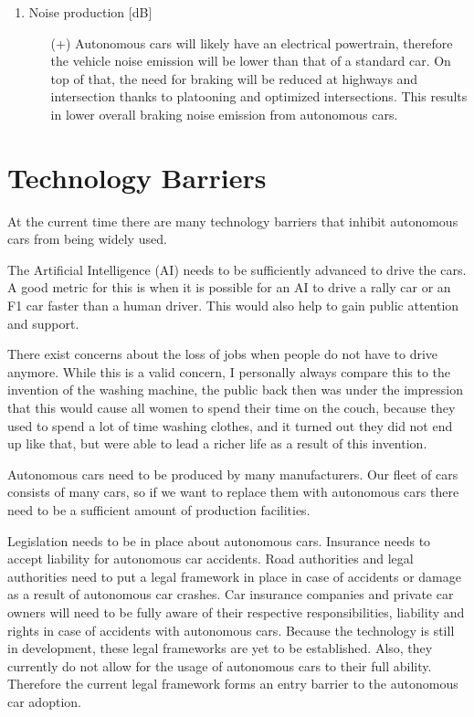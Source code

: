 \documentclass[a4paper]{article}
\begin{document}
\begin{enumerate}
\begin{enumerate}
    \end{enumerate}
\item Noise production [dB]
    \begin{enumerate}
    \item[($+$)] Autonomous cars will likely have an electrical powertrain, therefore the vehicle noise emission will be lower than that of a standard car. On top of that, the need for braking will be reduced at highways and intersection thanks to platooning and optimized intersections. This results in lower overall braking noise emission from autonomous cars.
    \end{enumerate}
\end{enumerate}

\section{Technology Barriers}
\label{sec:technology-barriers}

At the current time there are many technology barriers that inhibit autonomous cars from being widely used.

The Artificial Intelligence (AI) needs to be sufficiently advanced to drive the cars. A good metric for this is when it is possible for an AI to drive a rally car or an F1 car faster than a human driver. This would also help to gain public attention and support.

There exist concerns about the loss of jobs when people do not have to drive anymore. While this is a valid concern, I personally always compare this to the invention of the washing machine, the public back then was under the impression that this would cause all women to spend their time on the couch, because they used to spend a lot of time washing clothes, and it turned out they did not end up like that, but were able to lead a richer life as a result of this invention.

Autonomous cars need to be produced by many manufacturers. Our fleet of cars consists of many cars, so if we want to replace them with autonomous cars there need to be a sufficient amount of production facilities.

Legislation needs to be in place about autonomous cars.
Insurance needs to accept liability for autonomous car accidents. Road authorities and legal authorities need to put a legal framework in place in case of accidents or damage as a result of autonomous car crashes. Car insurance companies and private car owners will need to be fully aware of their respective responsibilities, liability and rights in case of accidents with autonomous cars. Because the technology is still in development, these legal frameworks are yet to be established. Also, they currently do not allow for the usage of autonomous cars to their full ability. Therefore the current legal framework forms an entry barrier to the autonomous car adoption.
\end{document}
